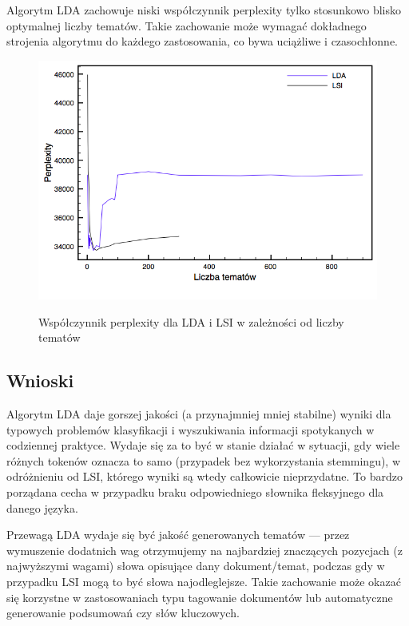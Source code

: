 \documentclass[11pt,a4paper]{article}
\begin{document}
Algorytm LDA zachowuje niski współczynnik perplexity tylko stosunkowo blisko
optymalnej liczby tematów. Takie zachowanie może wymagać dokładnego strojenia
algorytmu do każdego zastosowania, co bywa uciążliwe i czasochłonne.

\begin{figure}[h]
\caption{Współczynnik perplexity dla LDA i LSI w zależności od liczby tematów}
\includegraphics[width=\linewidth]{gfx/perplexity.png}
\label{fig:perplexity}
\end{figure}

\FloatBarrier

\subsection{Wnioski}

Algorytm LDA daje gorszej jakości (a przynajmniej mniej stabilne) wyniki dla
typowych problemów klasyfikacji i wyszukiwania informacji spotykanych w
codziennej praktyce. Wydaje się za to być w stanie działać w sytuacji, gdy
wiele różnych tokenów oznacza to samo (przypadek bez wykorzystania stemmingu),
w odróżnieniu od LSI, którego wyniki są wtedy całkowicie nieprzydatne. To
bardzo porządana cecha w przypadku braku odpowiedniego słownika fleksyjnego dla
danego języka.

Przewagą LDA wydaje się być jakość generowanych tematów --- przez wymuszenie
dodatnich wag otrzymujemy na najbardziej znaczących pozycjach (z najwyższymi
wagami) słowa opisujące dany dokument/temat, podczas gdy w przypadku LSI mogą
to być słowa najodleglejsze. Takie zachowanie może okazać się korzystne w
zastosowaniach typu tagowanie dokumentów lub automatyczne generowanie
podsumowań czy słów kluczowych.
\pagebreak
\end{document}
